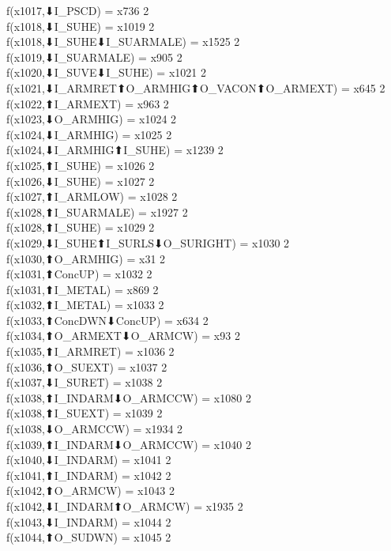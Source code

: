 f(x1017,⬇I_PSCD) = x736 {2} \\
f(x1018,⬇I_SUHE) = x1019 {2} \\
f(x1018,⬇I_SUHE⬇I_SUARMALE) = x1525 {2} \\
f(x1019,⬇I_SUARMALE) = x905 {2} \\
f(x1020,⬇I_SUVE⬇I_SUHE) = x1021 {2} \\
f(x1021,⬇I_ARMRET⬆O_ARMHIG⬆O_VACON⬆O_ARMEXT) = x645 {2} \\
f(x1022,⬆I_ARMEXT) = x963 {2} \\
f(x1023,⬇O_ARMHIG) = x1024 {2} \\
f(x1024,⬇I_ARMHIG) = x1025 {2} \\
f(x1024,⬇I_ARMHIG⬆I_SUHE) = x1239 {2} \\
f(x1025,⬆I_SUHE) = x1026 {2} \\
f(x1026,⬇I_SUHE) = x1027 {2} \\
f(x1027,⬆I_ARMLOW) = x1028 {2} \\
f(x1028,⬆I_SUARMALE) = x1927 {2} \\
f(x1028,⬆I_SUHE) = x1029 {2} \\
f(x1029,⬇I_SUHE⬆I_SURLS⬇O_SURIGHT) = x1030 {2} \\
f(x1030,⬆O_ARMHIG) = x31 {2} \\
f(x1031,⬆ConcUP) = x1032 {2} \\
f(x1031,⬆I_METAL) = x869 {2} \\
f(x1032,⬆I_METAL) = x1033 {2} \\
f(x1033,⬆ConcDWN⬇ConcUP) = x634 {2} \\
f(x1034,⬆O_ARMEXT⬇O_ARMCW) = x93 {2} \\
f(x1035,⬆I_ARMRET) = x1036 {2} \\
f(x1036,⬆O_SUEXT) = x1037 {2} \\
f(x1037,⬇I_SURET) = x1038 {2} \\
f(x1038,⬆I_INDARM⬇O_ARMCCW) = x1080 {2} \\
f(x1038,⬆I_SUEXT) = x1039 {2} \\
f(x1038,⬇O_ARMCCW) = x1934 {2} \\
f(x1039,⬆I_INDARM⬇O_ARMCCW) = x1040 {2} \\
f(x1040,⬇I_INDARM) = x1041 {2} \\
f(x1041,⬆I_INDARM) = x1042 {2} \\
f(x1042,⬆O_ARMCW) = x1043 {2} \\
f(x1042,⬇I_INDARM⬆O_ARMCW) = x1935 {2} \\
f(x1043,⬇I_INDARM) = x1044 {2} \\
f(x1044,⬆O_SUDWN) = x1045 {2} \\
